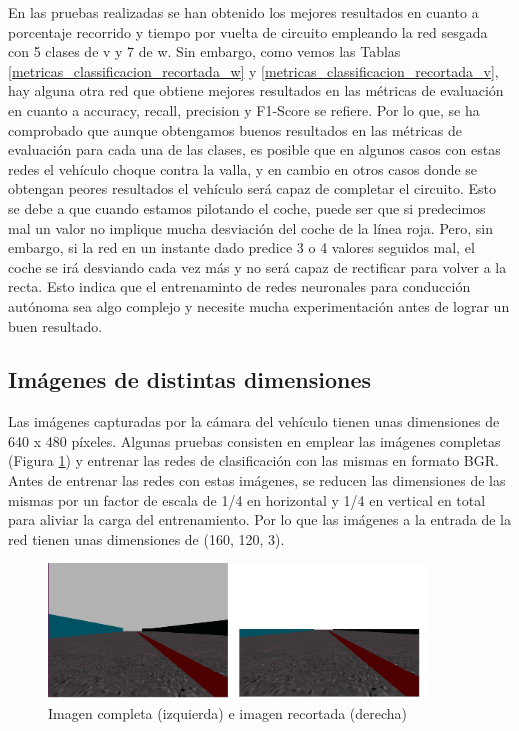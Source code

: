 En las pruebas realizadas se han obtenido los mejores resultados en cuanto a porcentaje recorrido y tiempo por vuelta de circuito empleando la red sesgada con 5 clases de v y 7 de w. Sin embargo, como vemos las Tablas \ref{metricas_classificacion_recortada_w} y \ref{metricas_classificacion_recortada_v}, hay alguna otra red que obtiene mejores resultados en las métricas de evaluación en cuanto a accuracy, recall, precision y F1-Score se refiere. Por lo que, se ha comprobado que aunque obtengamos buenos resultados en las métricas de evaluación para cada una de las clases, es posible que en algunos casos con estas redes el vehículo choque contra la valla, y en cambio en otros casos donde se obtengan peores resultados el vehículo será capaz de completar el circuito. Esto se debe a que cuando estamos pilotando el coche, puede ser que si predecimos mal un valor no implique mucha desviación del coche de la línea roja. Pero, sin embargo, si la red en un instante dado predice 3 o 4 valores seguidos mal, el coche se irá desviando cada vez más y no será capaz de rectificar para volver a la recta. Esto indica que el entrenaminto de redes neuronales para conducción autónoma sea algo complejo y necesite mucha experimentación antes de lograr un buen resultado.


\subsection{Imágenes de distintas dimensiones}\label{img_dimension}

Las imágenes capturadas por la cámara del vehículo tienen unas dimensiones de 640 x 480 píxeles. Algunas pruebas consisten en emplear las imágenes completas (Figura \ref{fig.imgs_class}) y entrenar las redes de clasificación con las mismas en formato BGR. Antes de entrenar las redes con estas imágenes, se reducen las dimensiones de las mismas por un factor de escala de 1/4 en horizontal y 1/4 en vertical en total para aliviar la carga del entrenamiento. Por lo que las imágenes a la entrada de la red tienen unas dimensiones de (160, 120, 3).\\

\begin{figure}
\begin{center}
	\includegraphics[width=0.9\textwidth]{figures/Clasificacion/imgs.png}
   \caption{Imagen completa (izquierda) e imagen recortada (derecha)}
	\label{fig.imgs_class}
\end{center}
\end{figure}

